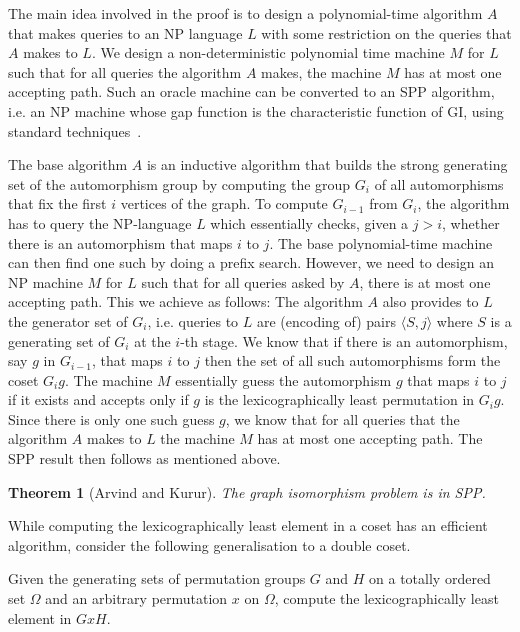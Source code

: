 \documentclass{article}
\newtheorem{theorem}{Theorem}[section]
\begin{document}
The main idea involved in the proof is to design a polynomial-time
algorithm $A$ that makes queries to an NP language $L$ with some
restriction on the queries that $A$ makes to $L$. We design a
non-deterministic polynomial time machine $M$ for $L$ such that for
all queries the algorithm $A$ makes, the machine $M$ has at most one
accepting path. Such an oracle machine can be converted to an SPP
algorithm, i.e. an NP machine whose gap function is the characteristic
function of GI, using standard techniques~\cite{kobler92graph}.

The base algorithm $A$ is an inductive algorithm that builds the
strong generating set of the automorphism group by computing the group
$G_i$ of all automorphisms that fix the first $i$ vertices of the
graph. To compute $G_{i-1}$ from $G_i$, the algorithm has to query the
NP-language $L$ which essentially checks, given a $j> i$, whether
there is an automorphism that maps $i$ to $j$.  The base
polynomial-time machine can then find one such by doing a prefix
search. However, we need to design an NP machine $M$ for $L$ such that
for all queries asked by $A$, there is at most one accepting
path. This we achieve as follows: The algorithm $A$ also provides to
$L$ the generator set of $G_i$, i.e. queries to $L$ are (encoding of)
pairs $\langle S,j\rangle$ where $S$ is a generating set of $G_i$ at
the $i$-th stage. We know that if there is an automorphism, say $g$ in
$G_{i-1}$, that maps $i$ to $j$ then the set of all such automorphisms
form the coset $G_i g$. The machine $M$ essentially guess the
automorphism $g$ that maps $i$ to $j$ if it exists and accepts only if
$g$ is the lexicographically least permutation in $G_ig$. Since there
is only one such guess $g$, we know that for all queries that the
algorithm $A$ makes to $L$ the machine $M$ has at most one accepting
path. The SPP result then follows as mentioned above.

\begin{theorem}[Arvind and Kurur]
  The graph isomorphism problem is in SPP.
\end{theorem}

While computing the lexicographically least element in a coset has an
efficient algorithm, consider the following generalisation to a double
coset.

\begin{problem}
  Given the generating sets of permutation groups $G$ and $H$ on a
  totally ordered set $\Omega$ and an arbitrary permutation $x$ on
  $\Omega$, compute the lexicographically least element in $GxH$.
\end{problem}
\end{document}
